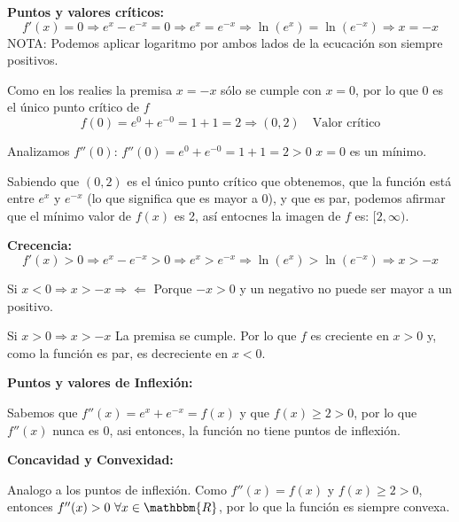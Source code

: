 \documentclass[12pt]{article}
\begin{document}
\begin{enumerate}[\hspace{9px} a)]
        \textbf{Puntos y valores cr\'iticos: }
            \begin{equation*}
                f'(x)=0 \Rightarrow e^x-e^{-x}=0 \Rightarrow e^x=e^{-x} \Rightarrow \ln(e^x)=\ln(e^{-x}) \Rightarrow x=-x
            \end{equation*}
            NOTA: Podemos aplicar logaritmo por ambos lados de la ecucaci\'on son siempre positivos.\medskip

            Como en los realies la premisa \(x = -x\) s\'olo se cumple con \(x=0\), por lo que 0 es el \'unico punto cr\'itico de \(f\)
            \begin{equation*}
                f(0)=e^0+e^{-0}=1+1=2 \Longrightarrow (0,2) \quad \text{Valor crítico}
            \end{equation*}

            Analizamos \(f''(0)\): \quad \(f''(0)=e^0+e^{-0}=1+1=2>0\) \(x=0\) es un m\'inimo.\medskip

            Sabiendo que \((0,2)\) es el \'unico punto cr\'itico que obtenemos, que la funci\'on est\'a entre \(e^x\) y \(e^{-x}\) (lo que significa que es mayor a 0), y que es par, podemos afirmar que el m\'inimo valor de \(f(x)\) es 2, as\'i entocnes la imagen de \(f\) es: \([2,\infty)\).

        \textbf{Crecencia: }
        \begin{equation*}
            f'(x)>0 \Rightarrow e^x-e^{-x}>0 \Rightarrow e^x>e^{-x} \Rightarrow \ln(e^x)>\ln(e^{-x}) \Rightarrow x>-x
        \end{equation*}

        Si \(x<0 \Rightarrow x>-x\Rightarrow\!\Leftarrow\) Porque \(-x>0\) y un negativo no puede ser mayor a un positivo.\medskip

        Si \(x>0 \Rightarrow x>-x\) La premisa se cumple. Por lo que \(f\) es creciente en \(x>0\) y, como la funci\'on es par, es decreciente en \(x<0\).\medskip

        \textbf{Puntos y valores de Inflexi\'on: }\medskip

            Sabemos que \(f''(x)=e^x+e^{-x}=f(x)\) y que \(f(x)\geq2>0\), por lo que \(f''(x)\) nunca es 0, asi entonces, la funci\'on no tiene puntos de inflexi\'on.\medskip

        \textbf{Concavidad y Convexidad: }

            Analogo a los puntos de inflexi\'on. Como \(f''(x)=f(x)\) y \(f(x)\geq2>0\), entonces \(f''(x)>0 \ \forall x\in\mathbbm{R}\), por lo que la funci\'on es siempre convexa.\medskip


\end{enumerate}
\end{document}
